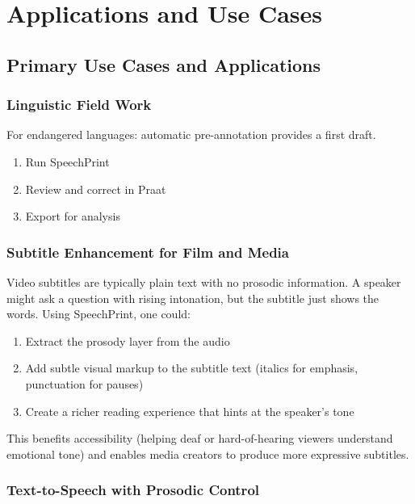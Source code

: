 \chapter{Applications and Use Cases}
\label{scenarios}

\section{Primary Use Cases and Applications}

\subsection{Linguistic Field Work}

For endangered languages: automatic pre-annotation provides a first draft.

\begin{enumerate}
\item Run SpeechPrint
\item Review and correct in Praat
\item Export for analysis
\end{enumerate}

\subsection{Subtitle Enhancement for Film and Media}

Video subtitles are typically plain text with no prosodic information. A speaker might ask a question with rising intonation, but the subtitle just shows the words. Using SpeechPrint, one could:

\begin{enumerate}
\item Extract the prosody layer from the audio
\item Add subtle visual markup to the subtitle text (italics for emphasis, punctuation for pauses)
\item Create a richer reading experience that hints at the speaker's tone
\end{enumerate}

This benefits accessibility (helping deaf or hard-of-hearing viewers understand emotional tone) and enables media creators to produce more expressive subtitles.

\subsection{Text-to-Speech with Prosodic Control}

